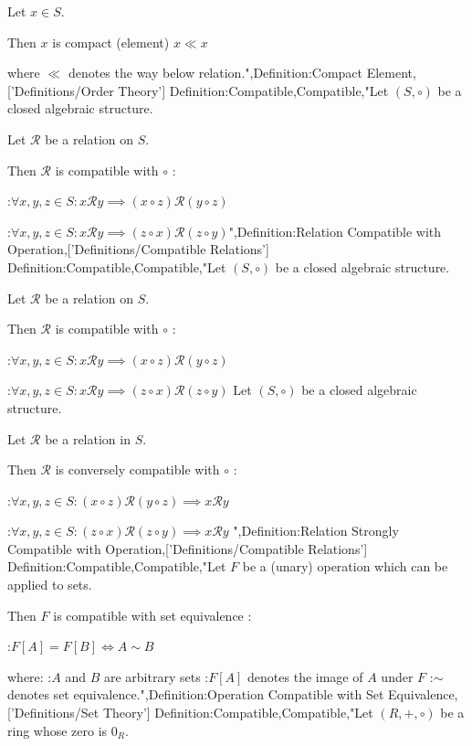Let $x \in S$.


Then $x$ is compact (element)  $x \ll x$

where $\ll$ denotes the way below relation.",Definition:Compact Element,['Definitions/Order Theory']
Definition:Compatible,Compatible,"Let $\left( S, \circ \right)$ be a closed algebraic structure.

Let $\mathcal R$ be a relation on $S$.


Then $\mathcal R$ is compatible with $\circ$ :

:$\forall x, y, z \in S: x \mathrel \mathcal R y \implies \left( x \circ z \right) \mathrel \mathcal R \left( y \circ z \right)$

:$\forall x, y, z \in S: x \mathrel \mathcal R y \implies \left( z \circ x \right) \mathrel \mathcal R \left( z \circ y \right)$",Definition:Relation Compatible with Operation,['Definitions/Compatible Relations']
Definition:Compatible,Compatible,"Let $\left( S, \circ \right)$ be a closed algebraic structure.

Let $\mathcal R$ be a relation on $S$.


Then $\mathcal R$ is compatible with $\circ$ :

:$\forall x, y, z \in S: x \mathrel \mathcal R y \implies \left( x \circ z \right) \mathrel \mathcal R \left( y \circ z \right)$

:$\forall x, y, z \in S: x \mathrel \mathcal R y \implies \left( z \circ x \right) \mathrel \mathcal R \left( z \circ y \right)$
Let $\left( S, \circ \right)$ be a closed algebraic structure.

Let $\mathcal R$ be a relation in $S$.


Then $\mathcal R$ is conversely compatible with $\circ$ :

:$\forall x, y, z \in S: \left( x \circ z \right) \mathrel \mathcal R \left( y \circ z \right) \implies x \mathrel \mathcal R y$

:$\forall x, y, z \in S: \left( z \circ x \right) \mathrel \mathcal R \left( z \circ y \right) \implies x \mathrel \mathcal R y$
",Definition:Relation Strongly Compatible with Operation,['Definitions/Compatible Relations']
Definition:Compatible,Compatible,"Let $F$ be a (unary) operation which can be applied to sets.


Then $F$ is compatible with set equivalence :

:$F \left[ A \right] = F \left[ B \right] \iff A \sim B$

where:
:$A$ and $B$ are arbitrary sets
:$F \left[ A \right]$ denotes the image of $A$ under $F$
:$\sim$ denotes set equivalence.",Definition:Operation Compatible with Set Equivalence,['Definitions/Set Theory']
Definition:Compatible,Compatible,"Let $\left( R, +, \circ \right)$ be a ring whose zero is $0_R$.


